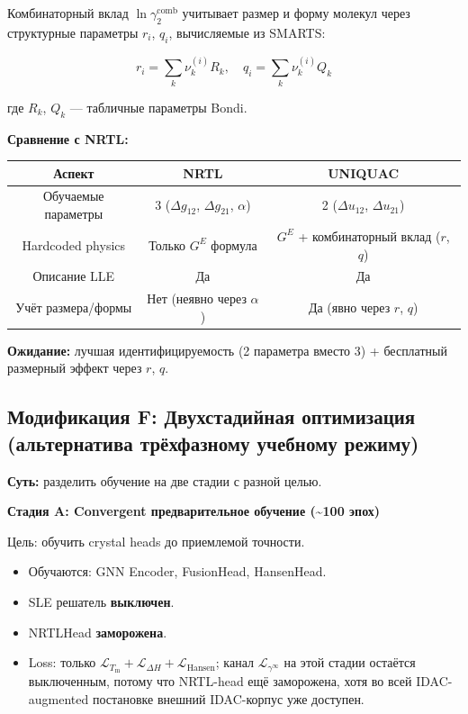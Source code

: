 \documentclass[11pt]{article}
\begin{document}
Комбинаторный вклад $\ln\gamma_2^{\mathrm{comb}}$ учитывает размер и форму молекул через структурные параметры $r_i$, $q_i$, вычисляемые из SMARTS:

\begin{equation*}
r_i = \sum_k \nu_k^{(i)} R_k, \quad q_i = \sum_k \nu_k^{(i)} Q_k
\end{equation*}

где $R_k$, $Q_k$ --- табличные параметры Bondi.

\textbf{Сравнение с NRTL:}

\begin{center}
\begin{tabular}{|c|c|c|}
\hline
Аспект & NRTL & UNIQUAC \\
\hline
Обучаемые параметры & 3 ($\Delta g_{12}$, $\Delta g_{21}$, $\alpha$) & 2 ($\Delta u_{12}$, $\Delta u_{21}$) \\
\hline
Hardcoded physics & Только $G^E$ формула & $G^E$ + комбинаторный вклад ($r$, $q$) \\
\hline
Описание LLE & Да & Да \\
\hline
Учёт размера/формы & Нет (неявно через $\alpha$) & Да (явно через $r$, $q$) \\
\hline
\end{tabular}
\end{center}

\textbf{Ожидание:} лучшая идентифицируемость (2 параметра вместо 3) + бесплатный размерный эффект через $r$, $q$.

\subsection{Модификация F: Двухстадийная оптимизация (альтернатива трёхфазному учебному режиму)}
\label{subsec:mod-f}

\textbf{Суть:} разделить обучение на две стадии с разной целью.

\textbf{Стадия A: Convergent предварительное обучение (\textasciitilde100 эпох)}

Цель: обучить crystal heads до приемлемой точности.

\begin{itemize}
  \item Обучаются: GNN Encoder, FusionHead, HansenHead.
  \item SLE решатель \textbf{выключен}.
  \item NRTLHead \textbf{заморожена}.
  \item Loss: только $\mathcal{L}_{T_{\mathrm{m}}} + \mathcal{L}_{\Delta H} + \mathcal{L}_{\mathrm{Hansen}}$; канал $\mathcal{L}_{\gamma^\infty}$ на этой стадии остаётся выключенным, потому что NRTL-head ещё заморожена, хотя во всей IDAC-augmented постановке внешний IDAC-корпус уже доступен.
\end{itemize}
\end{document}
